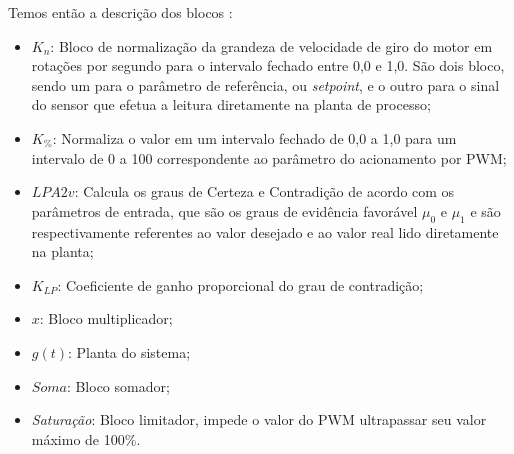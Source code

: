 \begin{figure}[!h]
\label{fig:diagramaBlocosLPA2v}
\end{figure}

Temos então a descrição dos blocos :

\begin{itemize}
  \item $K_n$: Bloco de normalização da grandeza de velocidade de giro do motor em rotações por segundo para o intervalo fechado entre 0,0 e 1,0. 
São dois bloco, sendo um para o parâmetro de referência, 
ou \emph{setpoint}, e o outro para o sinal do sensor que efetua a 
leitura diretamente na planta de processo;

  \item $K_{\%}$: Normaliza o valor em um intervalo fechado de 0,0 a 1,0 para um intervalo de 0 a 100 correspondente ao parâmetro do acionamento por PWM;

  \item $LPA2v$: Calcula os graus de Certeza e Contradição 
de acordo com os parâmetros de entrada, 
que são os graus de evidência favorável $\mu _0$ e $\mu _1$ e são
respectivamente referentes ao valor desejado e 
ao valor real lido diretamente na planta;

  \item $K_{LP}$: Coeficiente de ganho proporcional do grau de contradição;

  \item $x$: Bloco multiplicador;

  \item $g(t)$: Planta do sistema;

  \item $Soma$: Bloco somador;

  \item \emph{Saturação}: Bloco limitador, impede o valor do PWM ultrapassar seu valor máximo de 100\%. 
\end{itemize}



